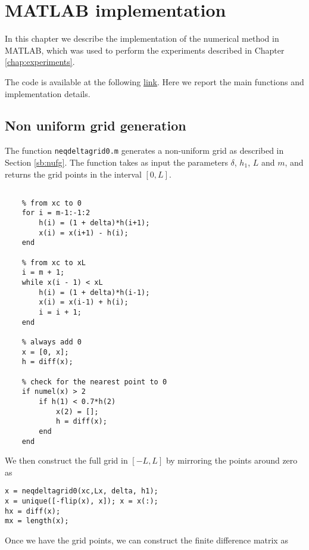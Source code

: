 \chapter{MATLAB\textsuperscript{\textregistered} implementation}

In this chapter we describe the implementation of the numerical method in MATLAB\textsuperscript{\textregistered}, which was used to perform the experiments described in Chapter \ref{chap:experiments}.

The code is available at the following \href{https://github.com/fofe1125/tesi}{link}. Here we report the main functions and implementation details.

\section{Non uniform grid generation}

The function \texttt{neqdeltagrid0.m} generates a non-uniform grid as described in Section \ref{sb:nufg}. The function takes as input the parameters $\delta$, $h_1$, $L$ and $m$, and returns the grid points in the interval $[0, L]$.

\begin{multicols}{2}
    \begin{lstlisting}

    % from xc to 0
    for i = m-1:-1:2
        h(i) = (1 + delta)*h(i+1);
        x(i) = x(i+1) - h(i);
    end

    % from xc to xL
    i = m + 1;
    while x(i - 1) < xL
        h(i) = (1 + delta)*h(i-1);
        x(i) = x(i-1) + h(i);
        i = i + 1;
    end

    % always add 0
    x = [0, x];
    h = diff(x);

    % check for the nearest point to 0
    if numel(x) > 2
        if h(1) < 0.7*h(2)
            x(2) = [];
            h = diff(x);
        end
    end

    \end{lstlisting}
\end{multicols}

We then construct the full grid in $[-L, L]$ by mirroring the points around zero as

\begin{lstlisting}
x = neqdeltagrid0(xc,Lx, delta, h1);
x = unique([-flip(x), x]); x = x(:);
hx = diff(x);
mx = length(x);
\end{lstlisting}

Once we have the grid points, we can construct the finite difference matrix as 


